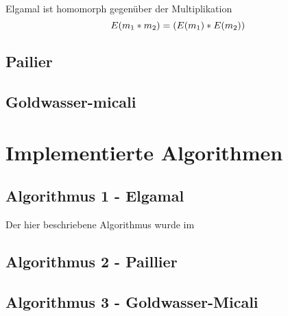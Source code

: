 Elgamal ist homomorph gegenüber der Multiplikation
$$ E(m \textsubscript{1} * m \textsubscript{2}) = (E(m \textsubscript{1}) * E(m \textsubscript{2}))$$

\subsection{Pailier}
\label{sec:Sec1.3.2}



\subsection{Goldwasser-micali}
\label{sec:Sec1.3.3}

\section{Implementierte Algorithmen}

\subsection{Algorithmus 1 - Elgamal}

Der hier beschriebene Algorithmus wurde im 

\subsection{Algorithmus 2 - Paillier}
\label{sec:Sec2.3}


\subsection{Algorithmus 3 - Goldwasser-Micali}
\label{sec:Sec2.4}